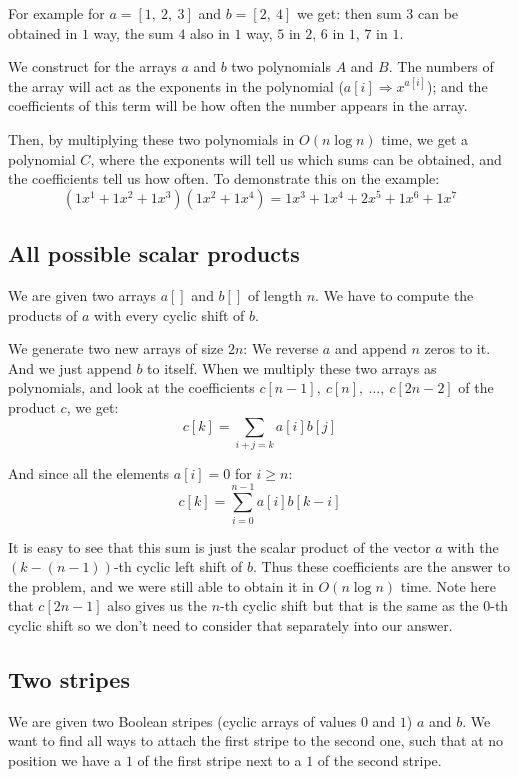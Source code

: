 \documentclass{article}
\begin{document}
For example for $a = [1,~ 2,~ 3]$ and $b = [2,~ 4]$ we get: then sum $3$ can be obtained in $1$ way, the sum $4$ also in $1$ way, $5$ in $2$, $6$ in $1$, $7$ in $1$.

We construct for the arrays $a$ and $b$ two polynomials $A$ and $B$. The numbers of the array will act as the exponents in the polynomial ($a[i] \Rightarrow x^{a[i]}$); and the coefficients of this term will be how often the number appears in the array.

Then, by multiplying these two polynomials in $O(n \log n)$ time, we get a polynomial $C$, where the exponents will tell us which sums can be obtained, and the coefficients tell us how often. To demonstrate this on the example:
$$(1 x^1 + 1 x^2 + 1 x^3) (1 x^2 + 1 x^4) = 1 x^3 + 1 x^4 + 2 x^5 + 1 x^6 + 1 x^7$$

\subsection{All possible scalar products}

We are given two arrays $a[]$ and $b[]$ of length $n$. We have to compute the products of $a$ with every cyclic shift of $b$.

We generate two new arrays of size $2n$: We reverse $a$ and append $n$ zeros to it. And we just append $b$ to itself. When we multiply these two arrays as polynomials, and look at the coefficients $c[n-1],~ c[n],~ \dots,~ c[2n-2]$ of the product $c$, we get:
$$c[k] = \sum_{i+j=k} a[i] b[j]$$

And since all the elements $a[i] = 0$ for $i \ge n$:
$$c[k] = \sum_{i=0}^{n-1} a[i] b[k-i]$$

It is easy to see that this sum is just the scalar product of the vector $a$ with the $(k - (n - 1))$-th cyclic left shift of $b$. Thus these coefficients are the answer to the problem, and we were still able to obtain it in $O(n \log n)$ time. Note here that $c[2n-1]$ also gives us the $n$-th cyclic shift but that is the same as the $0$-th cyclic shift so we don't need to consider that separately into our answer.

\subsection{Two stripes}

We are given two Boolean stripes (cyclic arrays of values $0$ and $1$) $a$ and $b$. We want to find all ways to attach the first stripe to the second one, such that at no position we have a $1$ of the first stripe next to a $1$ of the second stripe.
\end{document}
